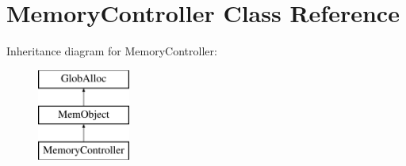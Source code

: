 \hypertarget{classMemoryController}{\section{Memory\-Controller Class Reference}
\label{classMemoryController}
}
Inheritance diagram for Memory\-Controller\-:\begin{figure}[H]
\begin{center}
\leavevmode
\includegraphics[height=3.000000cm]{classMemoryController}
\end{center}
\end{figure}
